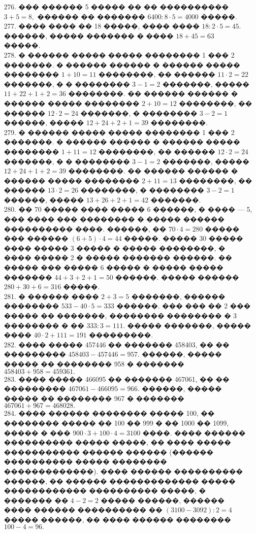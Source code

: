 \documentclass[12pt]{article}
\begin{document}
276. ��� ������ 5 ����� �� �� ���������� $3+5=8,$ ������ �� ������� $6400:8\cdot5=4000$ �����.\\
277. ���� ���� �� 18 �����, ���� ���� $18:2\cdot5=45.$ ������, ����� ������� � ���� $18+45=63$ �����.\\
278. � ������ ����� ����� �������� 1 ��� 2 �������. � ������ ������ � ������ ����� �������� $1+10=11$ ��������, �� ������ $11\cdot2=22$ �������, � � �������� $3-1=2$ �������, ����� $11+22+1+2=36$ ��������. �� ������ ������ � ������ ����� �������� $2+10=12$ ��������, �� ������ $12\cdot2=24$ �������, � �������� $3-2=1$ ������, ����� $12+24+2+1=39$ ��������.\\
279. � ������ ����� ����� �������� 1 ��� 2 �������. � ������ ������ � ������ ����� �������� $1+11=12$ ��������, �� ������ $12\cdot2=24$ �������, � � �������� $3-1=2$ �������, ����� $12+24+1+2=39$ ��������. �� ������ ������ � ������ ����� �������� $2+11=13$ ��������, �� ������ $13\cdot2=26$ ��������, � �������� $3-2=1$ ������, ����� $13+26+2+1=42$ �������.\\
280. �� 70 ����� ���� ����� 6 ������, � ���� --- 5, ��� ���� ��� �������� � ����� ������ ���������� ����. ������, �� $70\cdot4=280$ ����� ��� ������ $(6+5)\cdot4=44$ �����. ����� 30 ����� ���� ����� 3 ����� � ����� ��������, � ���� ����� 2 � ����� ������� ������. �� ����� ��� ����� 6 ����� � ����� ����� ������� $44+3+2+1=50$ ������. ����� ������ $280+30+6=316$ �����.\\
281. � ������ ���� $2+3=5$ �������, ������ �������� $533-40\cdot5=333$ ������. ��� ��� �� 2 ��� ����� �� �������, �������� �������� � 3 �������� � �� $333:3=111.$ ����� �������, ����� ���� $40\cdot2+111=191$ ���������.\\
282. ���� ����� 457446 �� ������� 458403, �� �� ��������� $458403-457446=957.$ ������, ����� ����� �� �������� 958 � ������� $458403+958=459361.$\\
283. ���� ����� 466095 �� ������� 467061, �� �� ��������� $467061-466095=966.$ ������, ����� ����� �� �������� 967 � ������� $467061+967=468028.$\\
284. ���� ������ �������� ����� 100, �� �������� ����� �� 100 �� 999 � �� 1000 �� 1099, ����� � ��� $900\cdot3+100\cdot4=3100$ ����. ���� ������ ���������� ����� �����, �� ���� ����� ����������� ������ ������ (������ ���������� ����� �������� �������������). ���� ������ ���������� ������, �� ������ ������������� ����� ������������ ���������� �����, � ������� �� $4-2=2$ ����� ������, ������ ���� ������ ���������� �� $(3100-3092):2=4$ ����� ������, �� ���� ������ �������� $100-4=96.$\\
\end{document}
